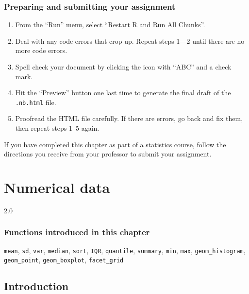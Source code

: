 \documentclass[
]{book}
\providecommand{\tightlist}{%
  \setlength{\itemsep}{0pt}\setlength{\parskip}{0pt}}
\begin{document}
\hypertarget{categorical-prep}{%
\subsection{Preparing and submitting your assignment}\label{categorical-prep}}

\begin{enumerate}
\def\labelenumi{\arabic{enumi}.}
\tightlist
\item
  From the ``Run'' menu, select ``Restart R and Run All Chunks''.
\item
  Deal with any code errors that crop up. Repeat steps 1---2 until there are no more code errors.
\item
  Spell check your document by clicking the icon with ``ABC'' and a check mark.
\item
  Hit the ``Preview'' button one last time to generate the final draft of the \texttt{.nb.html} file.
\item
  Proofread the HTML file carefully. If there are errors, go back and fix them, then repeat steps 1--5 again.
\end{enumerate}

If you have completed this chapter as part of a statistics course, follow the directions you receive from your professor to submit your assignment.

\hypertarget{numerical}{%
\chapter{Numerical data}\label{numerical}}

2.0

\hypertarget{functions-introduced-in-this-chapter-3}{%
\subsection*{Functions introduced in this chapter}\label{functions-introduced-in-this-chapter-3}}

\texttt{mean}, \texttt{sd}, \texttt{var}, \texttt{median}, \texttt{sort}, \texttt{IQR}, \texttt{quantile}, \texttt{summary}, \texttt{min}, \texttt{max}, \texttt{geom\_histogram}, \texttt{geom\_point}, \texttt{geom\_boxplot}, \texttt{facet\_grid}

\hypertarget{numerical-intro}{%
\section{Introduction}\label{numerical-intro}}
\end{document}
